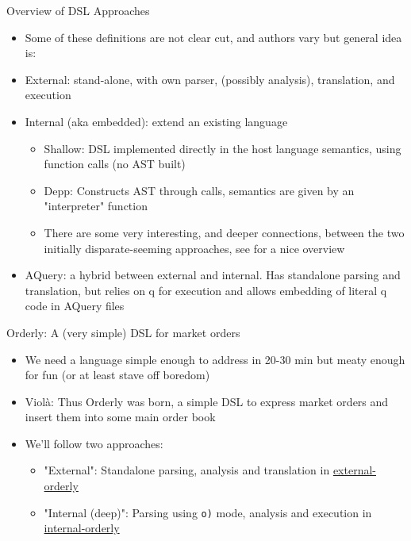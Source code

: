 \documentclass{beamer}
\begin{document}
\begin{frame}{Overview of DSL Approaches}
	\begin{itemize}
		\item Some of these definitions are not clear cut, and authors vary but general idea is:
		\item External: stand-alone, with own parser, (possibly analysis), translation, and execution \cite{artho}
		\item Internal (aka embedded): extend an existing language
			\begin{itemize}
				\item Shallow: DSL implemented directly in the host language semantics, using function calls (no AST built)
				\item Depp: Constructs AST through calls, semantics are given by an "interpreter" function\cite{gibbons}
				\item There are some very interesting, and deeper connections, between the two initially disparate-seeming approaches, see \cite{gibbons} for a nice overview
	\end{itemize}
		\item AQuery: a hybrid between external and internal. Has standalone parsing and translation, but relies on q for execution and allows embedding of literal q code in AQuery files
	\end{itemize}
\end{frame}

\begin{frame}{Orderly: A (very simple) DSL for market orders}
	\begin{itemize}
		\item We need a language simple enough to address in 20-30 min but meaty enough for fun (or at least stave off boredom)
		\item Viol\`a: Thus Orderly was born, a simple DSL to express market orders and insert them into some main order book
		\item We'll follow two approaches:
			\begin{itemize}
				\item "External": Standalone parsing, analysis and translation in \href{https://github.com/josepablocam/kxmeetup/tree/master/orderly-external}{external-orderly}
				\item "Internal (deep)": Parsing using \lstinline{o)} mode, analysis and execution in \href{https://github.com/josepablocam/kxmeetup/tree/master/orderly-internal}{internal-orderly}
			\end{itemize}
	\end{itemize}
\end{frame}
\end{document}
